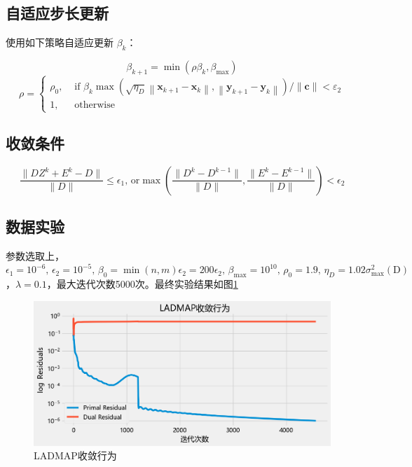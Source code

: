 \documentclass{homework}
\begin{document}
\begin{sol}
\subsection*{自适应步长更新}

使用如下策略自适应更新 \( \beta_k \)：

\[
\beta_{k+1} = \min(\rho \beta_k, \beta_{\max})
\]
$$
\rho= \begin{cases}\rho_0, & \text { if } \beta_k \max \left(\sqrt{\eta_D}\left\|\mathbf{x}_{k+1}-\mathbf{x}_k\right\|, \left\|\mathbf{y}_{k+1}-\mathbf{y}_k\right\|\right) /\|\mathbf{c}\|<\varepsilon_2 \\ 1, & \text { otherwise }\end{cases}
$$
\subsection*{收敛条件}
\[
\frac{\|DZ^k+E^k - D\|}{\|D\|}\le \epsilon_1,\, \text{or}
\max\left( \frac{\|D^k-D^{k-1}\|}{\|D\|}, \frac{\|E^k-E^{k-1}\|}{\|D\|} \right) < \epsilon_2
\]

\subsection*{数据实验}

参数选取上， \(\epsilon_1 = 10^{-6},\, \epsilon_2=10^{-5},\, \beta_0=\min(n,m)\epsilon_2 = 200\epsilon_2,\, \beta_{\max}=10^{10},\, \rho_0 = 1.9,\,\eta_D = 1.02\sigma^2_{\max}(\mathrm D) \)，$\lambda = 0.1$，最大迭代次数5000次。最终实验结果如图\ref{4}
\begin{figure}[h]
    \centering
        \centering
        \includegraphics[width=0.8\linewidth]{4.png}
        \caption{LADMAP收敛行为}\label{4}
\end{figure}
\end{sol}

% 
% 
\end{document}
